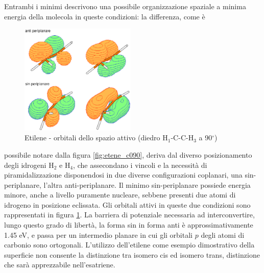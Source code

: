 Entrambi i minimi descrivono una possibile organizzazione spaziale a minima
energia della molecola in queste condizioni: la differenza, come \`e 
\begin{figure}
\includegraphics[angle=0,width=55mm,keepaspectratio]{immagini/etene/orbitali_c090.eps}
\caption{\small Etilene - orbitali dello spazio attivo (diedro H$_1$-C-C-H$_3$ a 90$^{\circ}$)}
\label{fig:etene_orbitali_c090}
\end{figure}
possibile notare dalla figura \ref{fig:etene_c090}, deriva dal diverso
posizionamento degli idrogeni H$_2$ e H$_4$, che assecondano i vincoli e la
necessit\`a di piramidalizzazione disponendosi in due diverse configurazioni
coplanari, una sin-periplanare, l'altra anti-periplanare. Il minimo
sin-periplanare possiede energia minore, anche a livello puramente nucleare,
sebbene presenti due atomi di idrogeno in posizione eclissata.
Gli orbitali attivi in queste due condizioni sono rappresentati in
figura \ref{fig:etene_orbitali_c090}.
La barriera di potenziale necessaria ad interconvertire, lungo questo grado
di libert\`a, la forma sin in forma anti \`e approssimativamente 1.45 eV, e passa per un
intermedio planare in cui gli orbitali $p$ degli atomi di carbonio sono
ortogonali.
L'utilizzo dell'etilene come esempio dimostrativo della superficie non
consente la distinzione tra isomero cis ed isomero trans, distinzione
che sar\`a apprezzabile nell'esatriene.

